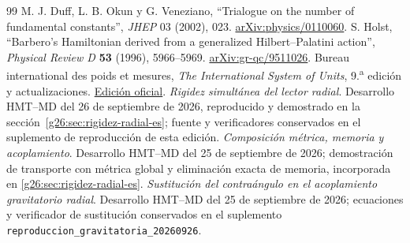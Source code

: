\begin{thebibliography}{99}
 M. J. Duff, L. B. Okun y G. Veneziano, ``Trialogue on the number of fundamental constants'', \emph{JHEP} 03 (2002), 023. \href{https://arxiv.org/abs/physics/0110060}{arXiv:physics/0110060}.
 S. Holst, ``Barbero's Hamiltonian derived from a generalized Hilbert--Palatini action'', \emph{Physical Review D} \textbf{53} (1996), 5966--5969. \href{https://arxiv.org/abs/gr-qc/9511026}{arXiv:gr-qc/9511026}.
 Bureau international des poids et mesures, \emph{The International System of Units}, 9.\textsuperscript{a} edición y actualizaciones. \href{https://www.bipm.org/en/publications/si-brochure}{Edición oficial}.
 \emph{Rigidez simultánea del lector radial}.
Desarrollo HMT--MD del 26 de septiembre de 2026, reproducido y demostrado
en la sección~\ref{g26:sec:rigidez-radial-es}; fuente y verificadores
conservados en el suplemento de reproducción de esta edición.
 \emph{Composición métrica, memoria y acoplamiento}.
Desarrollo HMT--MD del 25 de septiembre de 2026; demostración de transporte
con métrica global y eliminación exacta de memoria, incorporada en
\ref{g26:sec:rigidez-radial-es}.
 \emph{Sustitución del contraángulo en el acoplamiento
gravitatorio radial}. Desarrollo HMT--MD del 25 de septiembre de 2026;
ecuaciones y verificador de sustitución conservados en el suplemento
\texttt{reproduccion\_gravitatoria\_20260926}.
\end{thebibliography}
